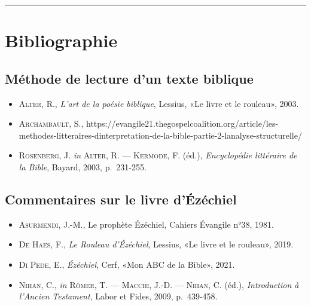 \begin{center}\rule{0.5\linewidth}{1pt}\end{center}
\section*{Bibliographie}
\subsection*{Méthode de lecture d'un texte biblique}
\begin{itemize}[label=]
    \item \textsc{Alter, R.}, \textit{L'art de la poésie biblique}, Lessius, «Le livre et le rouleau», 2003.
    \item \textsc{Archambault, S.}, https://evangile21.thegospelcoalition.org/article/les-methodes-litteraires-dinterpretation-de-la-bible-partie-2-lanalyse-structurelle/
    \item \textsc{Rosenberg, J.} \textit{in} \textsc{Alter, R. — Kermode, F.} (éd.), \textit{Encyclopédie littéraire de la Bible}, Bayard, 2003, p.~231-255.
\end{itemize}
\subsection*{Commentaires sur le livre d'Ézéchiel}
\begin{itemize}[label=]
    \item \textsc{Asurmendi, J.-M.}, Le prophète Ézéchiel, Cahiers Évangile n°38, 1981.
    \item \textsc{De Haes, F.}, \textit{Le Rouleau d'Ézéchiel}, Lessius, «Le livre et le rouleau», 2019.
    \item \textsc{Di Pede, E.}, \textit{Ézéchiel}, Cerf, «Mon ABC de la Bible», 2021.
    \item \textsc{Nihan, C.}, \textit{in} \textsc{Römer, T. — Macchi, J.-D. — Nihan, C.} (éd.), \textit{Introduction à l'Ancien Testament}, Labor et Fides, 2009, p.~439-458.
\end{itemize}